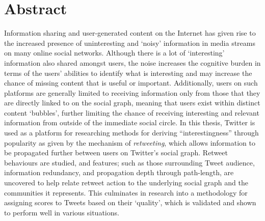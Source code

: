 \chapter*{Abstract}
Information sharing and user-generated content on the Internet has given rise to the increased presence of uninteresting and `noisy' information in media streams on many online social networks. Although there is a lot of `interesting' information also shared amongst users, the noise increases the cognitive burden in terms of the users' abilities to identify what is interesting and may increase the chance of missing content that is useful or important.
Additionally, users on such platforms are generally limited to receiving information only from those that they are directly linked to on the social graph, meaning that users exist within distinct content `bubbles', further limiting the chance of receiving interesting and relevant information from outside of the immediate social circle. 
In this thesis, Twitter is used as a platform for researching methods for deriving ``interestingness'' through popularity as given by the mechanism of \textit{retweeting}, which allows information to be propagated further between users on Twitter's social graph. Retweet behaviours are studied, and features; such as those surrounding Tweet audience, information redundancy, and propagation depth through path-length, are uncovered to help relate retweet action to the underlying social graph and the communities it represents. This culminates in research into a methodology for assigning scores to Tweets based on their `quality', which is validated and shown to perform well in various situations.


\tableofcontents

\listoffigures
\listoftables



\mainmatter 








\backmatter

\def\baselinestretch{1.24}\normalfont





